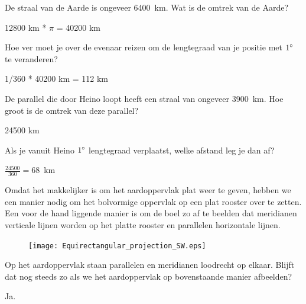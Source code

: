 \begin{opgave}
	\begin{subopgave}
		De straal van de Aarde is ongeveer 6400~km. Wat is de omtrek van de Aarde?
		\begin{antwoord}
			12800 km * $\pi$ = 40200 km
		\end{antwoord}			
	\end{subopgave}
	\begin{subopgave}
		Hoe ver moet je over de evenaar reizen om de lengtegraad van je positie met $1\degree$ te veranderen?
		\begin{antwoord}
			1/360 * 40200 km = 112 km
		\end{antwoord}
	\end{subopgave}
	\begin{subopgave}
		De parallel die door Heino loopt heeft een straal van ongeveer 3900~km. Hoe groot is de omtrek van deze parallel?
		\begin{antwoord}
			24500 km
		\end{antwoord}
	\end{subopgave}
	\begin{subopgave}
		Als je vanuit Heino $1\degree$ lengtegraad verplaatst, welke afstand leg je dan af?
		\begin{antwoord}
			$\frac{24500}{360} = 68$~km
		\end{antwoord}
	\end{subopgave}
\end{opgave}

Omdat het makkelijker is om het aardoppervlak plat weer te geven, hebben we een manier nodig om het bolvormige oppervlak op een plat rooster over te zetten. Een voor de hand liggende manier is om de boel zo af te beelden dat meridianen verticale lijnen worden op het platte rooster en parallelen horizontale lijnen.

\begin{figure}[h]
	\centering
	\texttt{[image: Equirectangular\_projection\_SW.eps]}
\end{figure}

\begin{opgave}
	Op het aardoppervlak staan parallelen en meridianen loodrecht op elkaar. Blijft dat nog steeds zo als we het aardoppervlak op bovenstaande manier afbeelden?
	\begin{antwoord}
		Ja.
	\end{antwoord}
\end{opgave}

